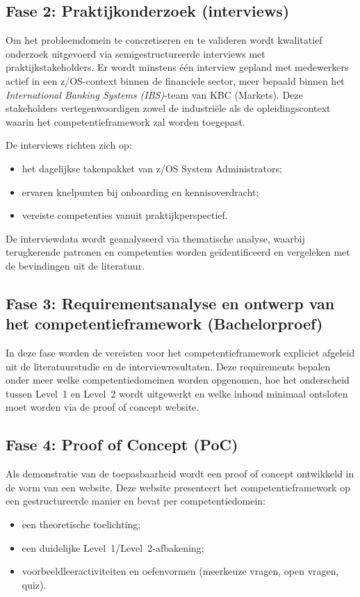 \subsection{Fase 2: Praktijkonderzoek (interviews)}

Om het probleemdomein te concretiseren en te valideren wordt kwalitatief onderzoek uitgevoerd via semigestructureerde interviews met praktijkstakeholders.
Er wordt minstens één interview gepland met medewerkers actief in een z/OS-context binnen de financiele sector, meer bepaald binnen het \textit{International Banking Systems (IBS)}-team van KBC (Markets).
Deze stakeholders vertegenwoordigen zowel de industriële als de opleidingscontext waarin het competentieframework zal worden toegepast.

De interviews richten zich op:
\begin{itemize}
	\item het dagelijkse takenpakket van z/OS System Administrators;
	\item ervaren knelpunten bij onboarding en kennisoverdracht;
	\item vereiste competenties vanuit praktijkperspectief.
\end{itemize}

De interviewdata wordt geanalyseerd via thematische analyse, waarbij terugkerende patronen en competenties worden geïdentificeerd en vergeleken met de bevindingen uit de literatuur.

\subsection{Fase 3: Requirementsanalyse en ontwerp van het competentieframework (Bachelorproef)}

In deze fase worden de vereisten voor het competentieframework expliciet afgeleid uit de literatuurstudie en de interviewresultaten. Deze requirements bepalen onder meer welke competentiedomeinen worden opgenomen, hoe het onderscheid tussen Level~1 en Level~2 wordt uitgewerkt en welke inhoud minimaal ontsloten moet worden via de proof of concept website.

\subsection{Fase 4: Proof of Concept (PoC)}

Als demonstratie van de toepasbaarheid wordt een proof of concept ontwikkeld in de vorm van een website.
Deze website presenteert het competentieframework op een gestructureerde manier en bevat per competentiedomein:
\begin{itemize}
	\item een theoretische toelichting;
	\item een duidelijke Level~1/Level~2-afbakening;
	\item voorbeeldleeractiviteiten en oefenvormen (meerkeuze vragen, open vragen, quiz).
\end{itemize}

